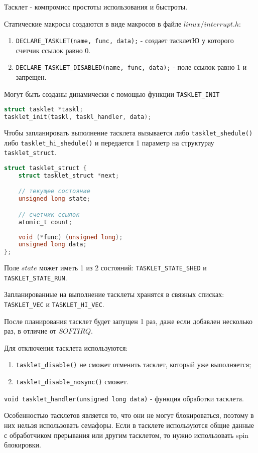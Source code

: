 Тасклет - компромисс простоты использования и быстроты. 

Статические макросы создаются в виде макросов в файле $linux/interrupt.h$:
\begin{enumerate}
	\item \verb|DECLARE_TASKLET(name, func, data);| - создает тасклетЮ у которого счетчик ссылок равно 0.
	\item \verb|DECLARE_TASKLET_DISABLED(name, func, data);| - поле ссылок равно 1 и запрещен.
\end{enumerate}

Могут быть созданы динамически с помощью функции \verb|TASKLET_INIT|
\begin{lstlisting}[language=c]
struct tasklet *taskl;
tasklet_init(taskl, taskl_handler, data);
\end{lstlisting}

Чтобы запланировать выполнение тасклета вызывается либо \verb|tasklet_shedule()| либо \verb|tasklet_hi_shedule()| и передается 1 параметр на структурау \verb|tasklet_struct|.
\begin{lstlisting}[language=c, caption = Структура $tasklet\_struct$]
struct tasklet_struct {
	struct tasklet_struct *next;

	// текущее состояние
	unsigned long state;

	// счетчик ссылок 
	atomic_t count;
	
	void (*func) (unsigned long);
	unsigned long data;
};
\end{lstlisting}

Поле $state$ может иметь 1 из 2 состояний: \verb|TASKLET_STATE_SHED| и \verb|TASKLET_STATE_RUN|.

Запланированные на выполнение тасклеты хранятся в связных списках: \verb|TASKLET_VEC| и \verb|TASKLET_HI_VEC|.

После планирования тасклет будет запущен 1 раз, даже если добавлен несколько раз, в отличие от $SOFTIRQ$.

Для отключения тасклета используются:
\begin{enumerate}
	\item \verb|tasklet_disable()| не сможет отменить тасклет, который уже выполняется;
	\item \verb|tasklet_disable_nosync()| сможет.
\end{enumerate}

\verb|void tasklet_handler(unsigned long data)| - функция обработки тасклета.

Особенностью тасклетов является то, что они не могут блокироваться, поэтому в них нельзя использовать семафоры. Если в тасклете используются общие данные с обработчиком прерывания или другим тасклетом, то нужно использовать spin блокировки.

